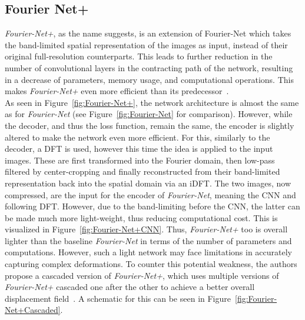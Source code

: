 \subsection{Fourier Net+} \label{SubSec:Fourier-Net+}
\emph{Fourier-Net+}, as the name suggests, is an extension of Fourier-Net which takes the band-limited spatial representation of the images as input, instead of their original full-resolution counterparts. This leads to further reduction in the number of convolutional layers in the contracting path of the network, resulting in a decrease of parameters, memory usage, and computational operations. This makes \emph{Fourier-Net+} even more efficient than its predecessor~\cite{Fourier-Net+}.\\
As seen in Figure~\ref{fig:Fourier-Net+}, the network architecture is almost the same as for \emph{Fourier-Net} (see Figure~\ref{fig:Fourier-Net} for comparison). However, while the decoder, and thus the loss function, remain the same, the encoder is slightly altered to make the network even more efficient. For this, similarly to the decoder, a DFT is used, however this time the idea is applied to the input images. These are first transformed into the Fourier domain, then low-pass filtered by center-cropping and finally reconstructed from their band-limited representation back into the spatial domain via an iDFT. The two images, now compressed, are the input for the encoder of \emph{Fourier-Net}, meaning the CNN and following DFT. However, due to the band-limiting before the CNN, the latter can be made much more light-weight, thus reducing computational cost. This is visualized in Figure~\ref{fig:Fourier-Net+CNN}. Thus, \emph{Fourier-Net+} too is overall lighter than the baseline \emph{Fourier-Net} in terms of the number of parameters and computations. However, such a light network may face limitations in accurately capturing complex deformations. To counter this potential weakness, the authors propose a cascaded version of \emph{Fourier-Net+}, which uses multiple versions of \emph{Fourier-Net+} cascaded one after the other to achieve a better overall displacement field~\cite{Fourier-Net+}. A schematic for this can be seen in Figure~\ref{fig:Fourier-Net+Cascaded}.

